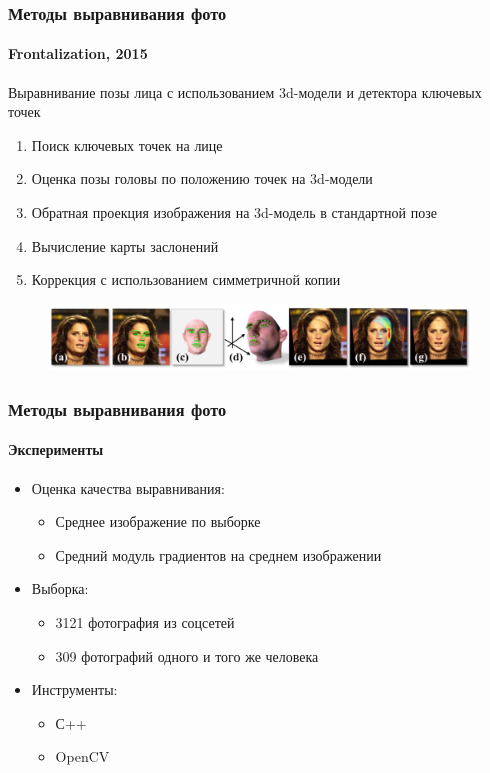 \documentclass{beamer}
\begin{document}
  \begin{frame}
  	  \frametitle{Методы выравнивания фото}
  	  \framesubtitle{Frontalization, 2015}
  	  Выравнивание позы лица с использованием 3d-модели и детектора ключевых точек
  	  \begin{enumerate}
  	  	\item Поиск ключевых точек на лице
  	  	\item Оценка позы головы по положению точек на 3d-модели
  	  	\item Обратная проекция изображения на 3d-модель в стандартной позе
  	  	\item Вычисление карты заслонений
  	  	\item Коррекция с использованием симметричной копии
  	  \end{enumerate}
  	  \begin{figure}
  	  	\includegraphics[width=\textwidth]{frontal2.png}
  	  \end{figure}
  \end{frame}
  
  \begin{frame}
  	  \frametitle{Методы выравнивания фото}
  	  \framesubtitle{Эксперименты}
	  \begin{itemize}
	  	\item Оценка качества выравнивания:
	  	\begin{itemize}
	  		\item Среднее изображение по выборке
	  		\item Средний модуль градиентов на среднем изображении
	  	\end{itemize}
	  	
	  	\vspace{1em}
		\item Выборка:
		\begin{itemize}
			\item 3121 фотография из соцсетей
			\item 309 фотографий одного и того же человека
        \end{itemize}
        
        \vspace{1em}
		\item Инструменты:
		\begin{itemize}
			\item С++
			\item OpenCV
		\end{itemize}				
	  \end{itemize}
  \end{frame}
  
\end{document}
